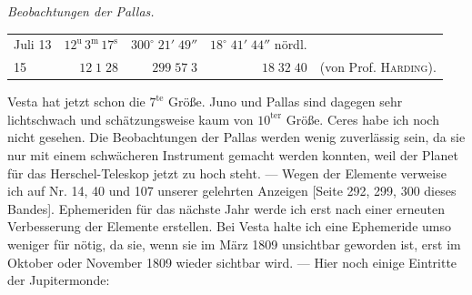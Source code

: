 \begin{center}\emph{Beobachtungen der Pallas.}\end{center}

\begin{center}\fontsize{9}{12}\selectfont\setlength{\tabcolsep}{3pt}\renewcommand{\arraystretch}{1.15}\begin{tabular}{lrrrl}
Juli 13 & $12^{\text{u}}\,3^{\text{m}}\,17^{\text{s}}$ & $300^\circ\;21'\;49''$ & $18^\circ\;41'\;44''$ nördl. & \\
15 & $12\;1\;28$ & $299\;57\;3$ & $18\;32\;40$ & (von Prof. \textsc{Harding}).\\
\end{tabular}\end{center}

\par\indent Vesta hat jetzt schon die $7^{\text{te}}$ Größe. Juno und Pallas sind dagegen sehr lichtschwach und schätzungsweise kaum von $10^{\text{ter}}$ Größe. Ceres habe ich noch nicht gesehen. Die Beobachtungen der Pallas werden wenig zuverlässig sein, da sie nur mit einem schwächeren Instrument gemacht werden konnten, weil der Planet für das Herschel-Teleskop jetzt zu hoch steht. --- Wegen der Elemente verweise ich auf Nr. 14, 40 und 107 unserer gelehrten Anzeigen [Seite 292, 299, 300 dieses Bandes]. Ephemeriden für das nächste Jahr werde ich erst nach einer erneuten Verbesserung der Elemente erstellen. Bei Vesta halte ich eine Ephemeride umso weniger für nötig, da sie, wenn sie im März 1809 unsichtbar geworden ist, erst im Oktober oder November 1809 wieder sichtbar wird. --- Hier noch einige Eintritte der Jupitermonde:

